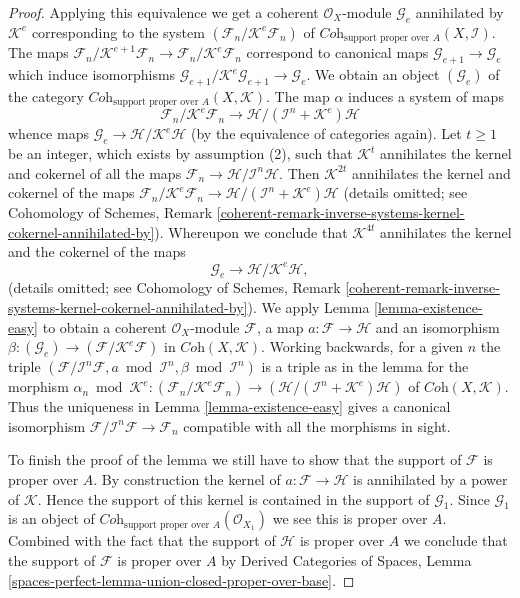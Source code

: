 \documentclass[10pt,a4paper]{amsart}
\theoremstyle{plain}
\theoremstyle{definition}
\theoremstyle{remark}
\numberwithin{equation}{subsection}
\begin{document}
\begin{proof}
\medskip\noindent
Applying this equivalence we get a coherent $\mathcal{O}_X$-module
$\mathcal{G}_e$ annihilated by $\mathcal{K}^e$ corresponding to the system
$(\mathcal{F}_n/\mathcal{K}^e\mathcal{F}_n)$ of
$\textit{Coh}_{\text{support proper over } A}(X, \mathcal{I})$. The maps
$\mathcal{F}_n/\mathcal{K}^{e + 1}\mathcal{F}_n \to
\mathcal{F}_n/\mathcal{K}^e\mathcal{F}_n$ correspond to canonical maps
$\mathcal{G}_{e + 1} \to \mathcal{G}_e$ which induce isomorphisms
$\mathcal{G}_{e + 1}/\mathcal{K}^e\mathcal{G}_{e + 1} \to \mathcal{G}_e$.
We obtain an object $(\mathcal{G}_e)$ of the category
$\textit{Coh}_{\text{support proper over } A}(X, \mathcal{K})$.
The map $\alpha$ induces a system of maps
$$
\mathcal{F}_n/\mathcal{K}^e\mathcal{F}_n
\longrightarrow
\mathcal{H}/(\mathcal{I}^n + \mathcal{K}^e)\mathcal{H}
$$
whence maps $\mathcal{G}_e \to \mathcal{H}/\mathcal{K}^e\mathcal{H}$
(by the equivalence of categories again).
Let $t \geq 1$ be an integer, which exists by assumption (2),
such that $\mathcal{K}^t$ annihilates the kernel and cokernel of all the maps
$\mathcal{F}_n \to \mathcal{H}/\mathcal{I}^n\mathcal{H}$.
Then $\mathcal{K}^{2t}$ annihilates the kernel and cokernel of the maps
$\mathcal{F}_n/\mathcal{K}^e\mathcal{F}_n \to
\mathcal{H}/(\mathcal{I}^n + \mathcal{K}^e)\mathcal{H}$
(details omitted; see Cohomology of Schemes,
Remark \ref{coherent-remark-inverse-systems-kernel-cokernel-annihilated-by}).
Whereupon we conclude that $\mathcal{K}^{4t}$ annihilates the kernel and
the cokernel of the maps
$$
\mathcal{G}_e
\longrightarrow
\mathcal{H}/\mathcal{K}^e\mathcal{H},
$$
(details omitted;  see Cohomology of Schemes,
Remark \ref{coherent-remark-inverse-systems-kernel-cokernel-annihilated-by}).
We apply Lemma \ref{lemma-existence-easy} to obtain a coherent
$\mathcal{O}_X$-module $\mathcal{F}$, a map
$a : \mathcal{F} \to \mathcal{H}$ and an isomorphism
$\beta : (\mathcal{G}_e) \to (\mathcal{F}/\mathcal{K}^e\mathcal{F})$
in $\textit{Coh}(X, \mathcal{K})$. Working backwards, for a given $n$
the triple
$(\mathcal{F}/\mathcal{I}^n\mathcal{F}, a \bmod \mathcal{I}^n, \beta
\bmod \mathcal{I}^n)$ is a triple as in the lemma for the morphism
$\alpha_n \bmod \mathcal{K}^e :
(\mathcal{F}_n/\mathcal{K}^e\mathcal{F}_n) \to
(\mathcal{H}/(\mathcal{I}^n + \mathcal{K}^e)\mathcal{H})$
of $\textit{Coh}(X, \mathcal{K})$. Thus the uniqueness in
Lemma \ref{lemma-existence-easy}
gives a canonical isomorphism
$\mathcal{F}/\mathcal{I}^n\mathcal{F} \to \mathcal{F}_n$
compatible with all the morphisms in sight.

\medskip\noindent
To finish the proof of the lemma we still have to show that the
support of $\mathcal{F}$ is proper over $A$.
By construction the kernel of $a : \mathcal{F} \to \mathcal{H}$
is annihilated by a power of $\mathcal{K}$. Hence the support of
this kernel is contained in the support of $\mathcal{G}_1$. Since
$\mathcal{G}_1$ is an object of
$\textit{Coh}_{\text{support proper over } A}(\mathcal{O}_{X_1})$
we see this is proper over $A$. Combined with the fact that the
support of $\mathcal{H}$ is proper over $A$ we conclude that the
support of $\mathcal{F}$ is proper over $A$ by
Derived Categories of Spaces, Lemma
\ref{spaces-perfect-lemma-union-closed-proper-over-base}.
\end{proof}
\end{document}
